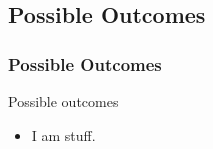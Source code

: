 \documentclass[compress,xcolor=table]{beamer}
\begin{document}
\subsection[Possible Outcomes]{Possible Outcomes}
\begin{frame}
\frametitle{Possible Outcomes}

Possible outcomes

\begin{itemize}
\item{I am stuff.}
\end{itemize}

\end{frame}
\end{document}
